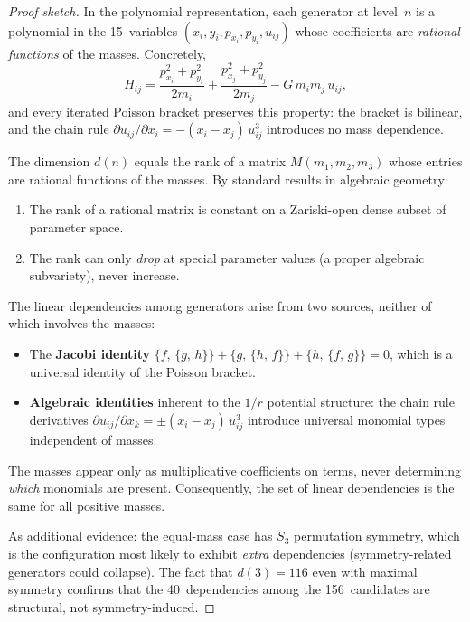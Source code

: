 \documentclass[11pt,a4paper]{article}
\theoremstyle{remark}
\newcommand{\pb}[2]{\{#1,\,#2\}}
\begin{document}
\begin{proof}[Proof sketch]
In the polynomial representation, each generator at level~$n$ is a
polynomial in the 15~variables $(x_i, y_i, p_{x_i}, p_{y_i}, u_{ij})$
whose coefficients are \emph{rational functions} of the masses.
Concretely,
\[
  H_{ij} = \frac{p_{x_i}^2 + p_{y_i}^2}{2m_i}
         + \frac{p_{x_j}^2 + p_{y_j}^2}{2m_j}
         - G\,m_i m_j\, u_{ij},
\]
and every iterated Poisson bracket preserves this property: the
bracket is bilinear, and the chain rule
$\partial u_{ij}/\partial x_i = -(x_i - x_j)\,u_{ij}^3$
introduces no mass dependence.

The dimension $d(n)$ equals the rank of a matrix $M(m_1,m_2,m_3)$
whose entries are rational functions of the masses.  By standard
results in algebraic geometry:
\begin{enumerate}[nosep]
  \item The rank of a rational matrix is constant on a
    Zariski-open dense subset of parameter space.
  \item The rank can only \emph{drop} at special parameter values
    (a proper algebraic subvariety), never increase.
\end{enumerate}

The linear dependencies among generators arise from two sources,
neither of which involves the masses:
\begin{itemize}[nosep]
  \item The \textbf{Jacobi identity}
    $\pb{f}{\pb{g}{h}} + \pb{g}{\pb{h}{f}} + \pb{h}{\pb{f}{g}} = 0$,
    which is a universal identity of the Poisson bracket.
  \item \textbf{Algebraic identities} inherent to the $1/r$ potential
    structure: the chain rule derivatives
    $\partial u_{ij}/\partial x_k = \pm(x_i-x_j)\,u_{ij}^3$
    introduce universal monomial types independent of masses.
\end{itemize}

The masses appear only as multiplicative coefficients on terms,
never determining \emph{which} monomials are present.  Consequently,
the set of linear dependencies is the same for all positive masses.

As additional evidence: the equal-mass case has $S_3$ permutation
symmetry, which is the configuration most likely to exhibit
\emph{extra} dependencies (symmetry-related generators could
collapse).  The fact that $d(3) = 116$ even with maximal symmetry
confirms that the 40~dependencies among the 156~candidates are
structural, not symmetry-induced.
\end{proof}
\end{document}
